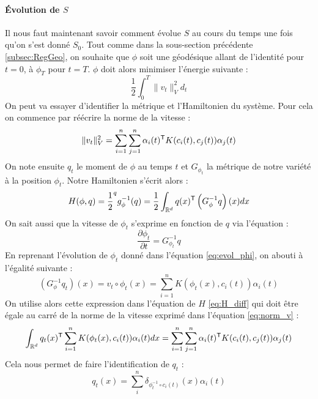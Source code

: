\paragraph{Évolution de $S$}
Il nous faut maintenant savoir comment évolue $S$ au cours du temps une fois qu'on s'est donné $S_0$. Tout comme dans la sous-section précédente \ref{subsec:RegGeo}, on souhaite que $\phi$ soit une géodésique allant de l'identité pour $t=0$, à $\phi_T$ pour $t=T$. $\phi$ doit alors minimiser l'énergie suivante :
\begin{equation}
	\frac{1}{2} \int_0^T \| v_t \|_V^2 d_t
\end{equation}
On peut va essayer d'identifier la métrique et l'Hamiltonien du système. Pour cela on commence par réécrire la norme de la vitesse :
\begin{equation}
	\label{eq:norm_v}
	\| v_t \|_V^2 = \sum_{i=1}^n \sum_{j=1}^n \alpha_i(t)^{\mathsf{T}} K(c_i(t), c_j(t)) \alpha_j(t)
\end{equation}
On note ensuite $q_t$ le moment de $\phi$ au temps $t$ et $G_{\phi_t}$ la métrique de notre variété à la position $\phi_t$. Notre Hamiltonien s'écrit alors :
\begin{equation}
	\label{eq:H_diff}
	H(\phi, q) = \frac{1}{2} \sp{q}{g_\phi^{-1}(q)} = \frac{1}{2} \int_{\mathbb{R}^d} q(x)^{\mathsf{T}} \left( G_\phi^{-1} q \right)(x) dx
\end{equation}
On sait aussi que la vitesse de $\phi_t$ s'exprime en fonction de $q$ via l'équation :
\begin{equation}
	\frac{\partial \phi_t}{\partial t} = G_{\phi_t}^{-1} q
\end{equation}
En reprenant l'évolution de $\phi_t$ donné dans l'équation \eqref{eq:evol_phi}, on abouti à l'égalité suivante :
\begin{equation}
	\label{eq:inv_g_q}
\left( G_\phi^{-1} q_t \right)(x) = v_t \circ \phi_t(x) = \sum_{i=1}^n K(\phi_t(x), c_i(t)) \alpha_i(t)
\end{equation}
On utilise alors cette expression dans l'équation de $H$ \eqref{eq:H_diff} qui doit être égale au carré de la norme de la vitesse exprimé dans l'équation \eqref{eq:norm_v} :
\begin{equation}
	\int_{\mathbb{R}^d} q_t(x)^{\mathsf{T}} \sum_{i=1}^n K(\phi_t(x), c_i(t)) \alpha_i(t) dx = \sum_{i=1}^n \sum_{j=1}^n \alpha_i(t)^{\mathsf{T}} K(c_i(t), c_j(t)) \alpha_j(t)
\end{equation}
Cela nous permet de faire l'identification de $q_t$ :
\begin{equation}
	\label{eq:q_t}
	q_t(x) = \sum_{i}^n \delta_{\phi_t^{-1} \circ c_i(t)}(x) \alpha_i(t)
\end{equation}
